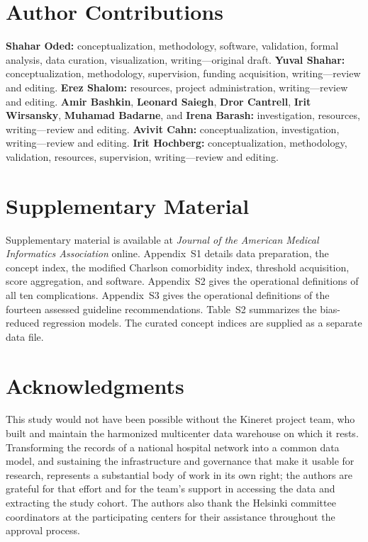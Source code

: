 
\section*{Author Contributions}
\textbf{Shahar Oded:} conceptualization, methodology, software, validation,
formal analysis, data curation, visualization, writing---original draft.
\textbf{Yuval Shahar:} conceptualization, methodology, supervision, funding
acquisition, writing---review and editing.
\textbf{Erez Shalom:} resources, project administration, writing---review and
editing.
\textbf{Amir Bashkin}, \textbf{Leonard Saiegh}, \textbf{Dror Cantrell},
\textbf{Irit Wirsansky}, \textbf{Muhamad Badarne}, and \textbf{Irena Barash:}
investigation, resources, writing---review and editing.
\textbf{Avivit Cahn:} conceptualization, investigation, writing---review and
editing.
\textbf{Irit Hochberg:} conceptualization, methodology, validation,
resources, supervision, writing---review and editing.

\section*{Supplementary Material}
Supplementary material is available at \emph{Journal of the American Medical
Informatics Association} online. Appendix~S1 details data preparation, the
concept index, the modified Charlson comorbidity index, threshold
acquisition, score aggregation, and software. Appendix~S2 gives the
operational definitions of all ten complications. Appendix~S3 gives the
operational definitions of the fourteen assessed guideline recommendations.
Table~S2 summarizes the bias-reduced regression models. The curated concept
indices are supplied as a separate data file.

\section*{Acknowledgments}
This study would not have been possible without the Kineret project team, who
built and maintain the harmonized multicenter data warehouse on which it
rests. Transforming the records of a national hospital network into a common
data model, and sustaining the infrastructure and governance that make it
usable for research, represents a substantial body of work in its own right;
the authors are grateful for that effort and for the team's support in
accessing the data and extracting the study cohort. The authors also thank
the Helsinki committee coordinators at the participating centers for their
assistance throughout the approval process.

